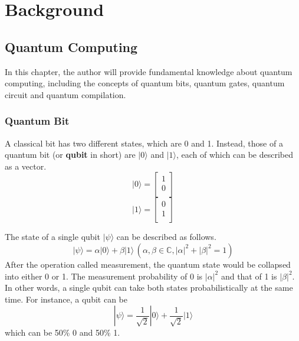 \chapter{Background}
\label{theory_of_quantum_information}
\section{ Quantum Computing}

 In this chapter, the author will provide fundamental knowledge about quantum computing, including the concepts of quantum bits, quantum gates, quantum circuit and quantum compilation.

\subsection{Quantum Bit}

 A classical bit has two different states, which are 0 and 1.   Instead, those of a quantum bit (or \textbf{qubit} in short) are $|0\rangle$ and $|1\rangle$, each of which can be described as a vector.  
 $$|0\rangle = \left[
\begin{array}{c}
1 \\
0 \\
\end{array}
\right]$$
 $$|1\rangle = \left[
\begin{array}{c}
0 \\
1 \\
\end{array}
\right]$$

The state of a single 	qubit $|\psi\rangle$ can be described as follows.
$$ |\psi\rangle = \alpha |0\rangle + \beta |1\rangle \,(\alpha, \beta \in \mathbb{C}, |\alpha|^2+|\beta|^2=1)$$
 After the operation called measurement, the quantum state would be collapsed into either 0 or 1.  The measurement probability of 0 is $|\alpha|^2$ and that of 1 is $|\beta|^2$. In other words, a single qubit can take both states probabilistically at the same time.  For instance, a qubit can be $$|\psi\rangle = \frac{1}{\sqrt{2}}|0\rangle + \frac{1}{\sqrt{2}}|1\rangle$$ which can be 50\% 0 and 50\% 1.
 
